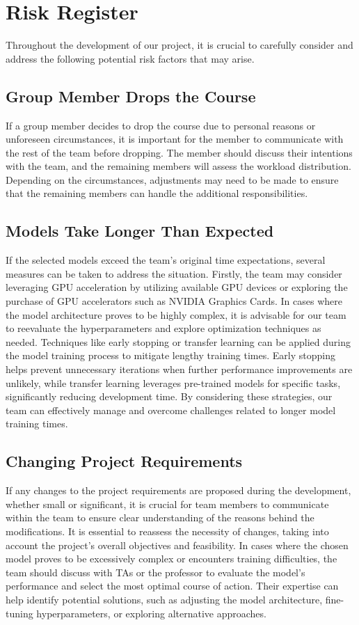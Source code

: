 \documentclass{article} %
\begin{document}

\section{Risk Register}
Throughout the development of our project, it is crucial to carefully consider and address the following potential risk factors that may arise.

\subsection{Group Member Drops the Course}
If a group member decides to drop the course due to personal reasons or unforeseen circumstances, it is important for the member to communicate with the rest of the team before dropping. The member should discuss their intentions with the team, and the remaining members will assess the workload distribution. Depending on the circumstances, adjustments may need to be made to ensure that the remaining members can handle the additional responsibilities.

\subsection{Models Take Longer Than Expected}
If the selected models exceed the team's original time expectations, several measures can be taken to address the situation. Firstly, the team may consider leveraging GPU acceleration by utilizing available GPU devices or exploring the purchase of GPU accelerators such as NVIDIA Graphics Cards. In cases where the model architecture proves to be highly complex, it is advisable for our team to reevaluate the hyperparameters and explore optimization techniques as needed. Techniques like early stopping or transfer learning can be applied during the model training process to mitigate lengthy training times. Early stopping helps prevent unnecessary iterations when further performance improvements are unlikely, while transfer learning leverages pre-trained models for specific tasks, significantly reducing development time. By considering these strategies, our team can effectively manage and overcome challenges related to longer model training times.

\subsection{Changing Project Requirements}
If any changes to the project requirements are proposed during the development, whether small or significant, it is crucial for team members to communicate within the team to ensure clear understanding of the reasons behind the modifications. It is essential to reassess the necessity of changes, taking into account the project's overall objectives and feasibility. In cases where the chosen model proves to be excessively complex or encounters training difficulties, the team should discuss with TAs or the professor to evaluate the model's performance and select the most optimal course of action. Their expertise can help identify potential solutions, such as adjusting the model architecture, fine-tuning hyperparameters, or exploring alternative approaches.
\end{document}
